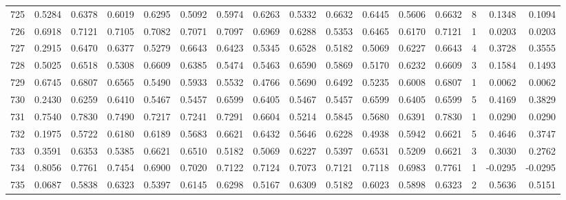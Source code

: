 \begin{tabular}{lrrrrrrrrrrrrrrr}
725 &      0.5284 &  0.6378 &  0.6019 &  0.6295 &  0.5092 &  0.5974 &  0.6263 &  0.5332 &  0.6632 &  0.6445 &   0.5606 &     0.6632 &      8 &                    0.1348 &                     0.1094 \\
726 &      0.6918 &  0.7121 &  0.7105 &  0.7082 &  0.7071 &  0.7097 &  0.6969 &  0.6288 &  0.5353 &  0.6465 &   0.6170 &     0.7121 &      1 &                    0.0203 &                     0.0203 \\
727 &      0.2915 &  0.6470 &  0.6377 &  0.5279 &  0.6643 &  0.6423 &  0.5345 &  0.6528 &  0.5182 &  0.5069 &   0.6227 &     0.6643 &      4 &                    0.3728 &                     0.3555 \\
728 &      0.5025 &  0.6518 &  0.5308 &  0.6609 &  0.6385 &  0.5474 &  0.5463 &  0.6590 &  0.5869 &  0.5170 &   0.6232 &     0.6609 &      3 &                    0.1584 &                     0.1493 \\
729 &      0.6745 &  0.6807 &  0.6565 &  0.5490 &  0.5933 &  0.5532 &  0.4766 &  0.5690 &  0.6492 &  0.5235 &   0.6008 &     0.6807 &      1 &                    0.0062 &                     0.0062 \\
730 &      0.2430 &  0.6259 &  0.6410 &  0.5467 &  0.5457 &  0.6599 &  0.6405 &  0.5467 &  0.5457 &  0.6599 &   0.6405 &     0.6599 &      5 &                    0.4169 &                     0.3829 \\
731 &      0.7540 &  0.7830 &  0.7490 &  0.7217 &  0.7241 &  0.7291 &  0.6604 &  0.5214 &  0.5845 &  0.5680 &   0.6391 &     0.7830 &      1 &                    0.0290 &                     0.0290 \\
732 &      0.1975 &  0.5722 &  0.6180 &  0.6189 &  0.5683 &  0.6621 &  0.6432 &  0.5646 &  0.6228 &  0.4938 &   0.5942 &     0.6621 &      5 &                    0.4646 &                     0.3747 \\
733 &      0.3591 &  0.6353 &  0.5385 &  0.6621 &  0.6510 &  0.5182 &  0.5069 &  0.6227 &  0.5397 &  0.6531 &   0.5209 &     0.6621 &      3 &                    0.3030 &                     0.2762 \\
734 &      0.8056 &  0.7761 &  0.7454 &  0.6900 &  0.7020 &  0.7122 &  0.7124 &  0.7073 &  0.7121 &  0.7118 &   0.6983 &     0.7761 &      1 &                   -0.0295 &                    -0.0295 \\
735 &      0.0687 &  0.5838 &  0.6323 &  0.5397 &  0.6145 &  0.6298 &  0.5167 &  0.6309 &  0.5182 &  0.6023 &   0.5898 &     0.6323 &      2 &                    0.5636 &                     0.5151 \\

\end{tabular}
